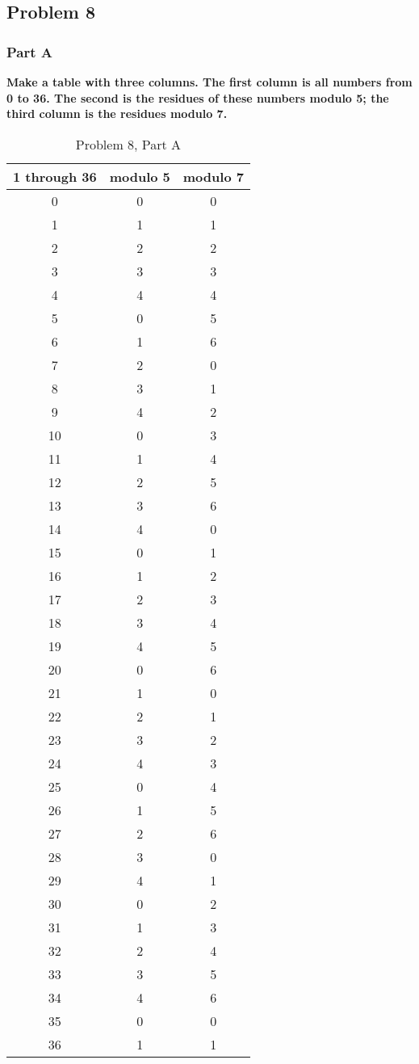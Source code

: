 \documentclass[11pt]{article}
\begin{document}
\subsection*{Problem 8}

\subsubsection*{Part A} 

\textbf{Make a table with three columns. The first column is all numbers
from 0 to 36. The second is the residues of these numbers modulo 5;
the third column is the residues modulo 7.}

\begin{table}[htdp]
\caption{Problem 8, Part A}
\begin{center}
\begin{tabular}{|c|c|c|}
\hline
1 through 36 & modulo 5 & modulo 7 \\\hline
0 & 0 & 0 \\
1 & 1 & 1 \\
2 & 2 & 2 \\
3 & 3 & 3 \\
4 & 4 & 4 \\
5 & 0 & 5 \\
6 & 1 & 6 \\
7 & 2 & 0 \\
8 & 3 & 1 \\
9 & 4 & 2 \\
10 & 0 & 3 \\
11 & 1 & 4 \\
12 & 2 & 5 \\
13 & 3 & 6 \\
14 & 4 & 0 \\
15 & 0 & 1 \\
16 & 1 & 2 \\
17 & 2 & 3 \\
18 & 3 & 4 \\
19 & 4 & 5 \\
20 & 0 & 6 \\
21 & 1 & 0 \\
22 & 2 & 1 \\
23 & 3 & 2 \\
24 & 4 & 3 \\
25 & 0 & 4 \\
26 & 1 & 5 \\
27 & 2 & 6 \\
28 & 3 & 0 \\
29 & 4 & 1 \\
30 & 0 & 2 \\
31 & 1 & 3 \\
32 & 2 & 4 \\
33 & 3 & 5 \\
34 & 4 & 6 \\
35 & 0 & 0 \\
36 & 1 & 1 \\
\hline
\end{tabular}
\end{center}
\label{default}
\end{table}
\end{document}
